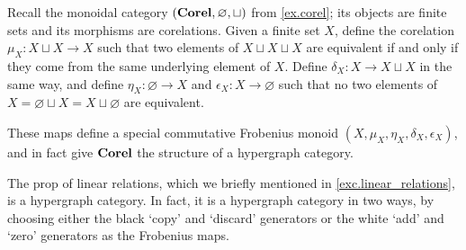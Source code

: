 \documentclass[7Sketches]{subfiles}
\begin{document}

\begin{example} %
\label{ex.frob_corel}%
%
  Recall the monoidal category $(\mathbf{Corel},\varnothing, \sqcup)$ from \cref{ex.corel}; its objects are finite sets and its morphisms are
  corelations. Given a finite set $X$, define the corelation $\mu_X\colon
  X\sqcup X \to X$ such that two elements of $X \sqcup X \sqcup X$ are
  equivalent if and only if they come from the same underlying element of $X$.
  Define $\delta_X\colon X \to X\sqcup X$ in the same way, and define
  $\eta_X\colon \varnothing \to X$ and $\epsilon_X\colon X \to \varnothing$ such
  that no two elements of $X = \varnothing \sqcup X = X \sqcup \varnothing$ are
  equivalent.

  These maps define a special commutative Frobenius monoid
  $(X,\mu_X,\eta_X,\delta_X,\epsilon_X)$, and in fact give $\mathbf{Corel}$
  the structure of a hypergraph category.
\end{example}

\begin{example} %
The prop of linear relations, which we briefly mentioned in
\cref{exc.linear_relations}, is a hypergraph category. In fact, it is a hypergraph
category in two ways, by choosing either the black `copy' and `discard'
generators or the white `add' and `zero' generators as the Frobenius maps.
\end{example}
\end{document}
